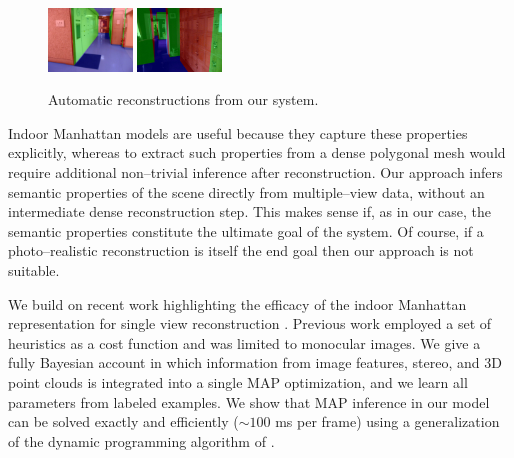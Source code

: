 \begin{figure}[tb]%
  \centering
    \includegraphics[width=0.2\textwidth]{figures/firstpage/lab_foyer2_frame041_dp.jpg}
    \includegraphics[width=0.2\textwidth]{figures/firstpage/exeter_mcr1_frame032_dp.jpg}
  \caption{Automatic reconstructions from our system.}
    \vspace{-5mm}
  \label{fig:firstpage}
\end{figure}

Indoor Manhattan models are useful because they capture these
properties explicitly, whereas to extract such properties from a dense
polygonal mesh would require additional non--trivial inference after
reconstruction. Our approach infers semantic properties of the scene
directly from multiple--view data, without an intermediate dense
reconstruction step. This makes sense if, as in our case, the semantic
properties constitute the ultimate goal of the system. Of course, if a
photo--realistic reconstruction is itself the end goal then our
approach is not suitable.

We build on recent work highlighting the efficacy of the indoor
Manhattan representation for single view reconstruction
\cite{Lee09,FlintECCV10}. Previous work employed a set of
heuristics as a cost function and was limited to monocular images. We
give a fully Bayesian account in which information from image
features, stereo, and 3D point clouds is integrated into a single MAP
optimization, and we learn all parameters from labeled examples. We
show that MAP inference in our model can be solved exactly and
efficiently ($\sim$$100$ ms per frame) using a generalization of the
dynamic programming algorithm of
\cite{FlintECCV10}.


